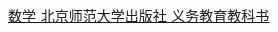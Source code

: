 \begin{thebibliography}{99}


   \href{http://archive.keyllo.com/J-%E6%95%99%E8%82%B2/0-%E5%B0%8F%E5%AD%A6/%E5%B0%8F%E5%AD%A6%E6%95%B0%E5%AD%A6/%E5%8C%97%E5%B8%88%E5%A4%A7%E7%89%88/%e5%8c%97%e5%b8%88%e5%a4%a7%e4%b8%80%e5%b9%b4%e7%ba%a7%e6%95%b0%e5%ad%a6%e4%b8%8a%e5%86%8c.pdf}{数学 北京师范大学出版社 义务教育教科书}

\end{thebibliography}